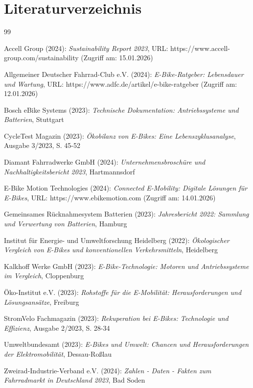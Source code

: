 \documentclass[12pt,a4paper]{article}
\begin{document}
\newpage

\section*{Literaturverzeichnis}

\begin{thebibliography}{99}

Accell Group (2024): \textit{Sustainability Report 2023}, URL: https://www.accell-group.com/sustainability (Zugriff am: 15.01.2026)

Allgemeiner Deutscher Fahrrad-Club e.V. (2024): \textit{E-Bike-Ratgeber: Lebensdauer und Wartung}, URL: https://www.adfc.de/artikel/e-bike-ratgeber (Zugriff am: 12.01.2026)

Bosch eBike Systems (2023): \textit{Technische Dokumentation: Antriebssysteme und Batterien}, Stuttgart

CycleTest Magazin (2023): \textit{Ökobilanz von E-Bikes: Eine Lebenszyklusanalyse}, Ausgabe 3/2023, S. 45-52

Diamant Fahrradwerke GmbH (2024): \textit{Unternehmensbroschüre und Nachhaltigkeitsbericht 2023}, Hartmannsdorf

E-Bike Motion Technologies (2024): \textit{Connected E-Mobility: Digitale Lösungen für E-Bikes}, URL: https://www.ebikemotion.com (Zugriff am: 14.01.2026)

Gemeinsames Rücknahmesystem Batterien (2023): \textit{Jahresbericht 2022: Sammlung und Verwertung von Batterien}, Hamburg

Institut für Energie- und Umweltforschung Heidelberg (2022): \textit{Ökologischer Vergleich von E-Bikes und konventionellen Verkehrsmitteln}, Heidelberg

Kalkhoff Werke GmbH (2023): \textit{E-Bike-Technologie: Motoren und Antriebssysteme im Vergleich}, Cloppenburg

Öko-Institut e.V. (2023): \textit{Rohstoffe für die E-Mobilität: Herausforderungen und Lösungsansätze}, Freiburg

StromVelo Fachmagazin (2023): \textit{Rekuperation bei E-Bikes: Technologie und Effizienz}, Ausgabe 2/2023, S. 28-34

Umweltbundesamt (2023): \textit{E-Bikes und Umwelt: Chancen und Herausforderungen der Elektromobilität}, Dessau-Roßlau

Zweirad-Industrie-Verband e.V. (2024): \textit{Zahlen - Daten - Fakten zum Fahrradmarkt in Deutschland 2023}, Bad Soden

\end{thebibliography}
\end{document}

